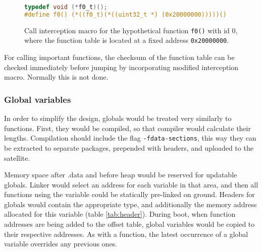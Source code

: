 \begin{figure} [htb]
\begin{lstlisting}[language=C]
typedef void (*f0_t)();
#define f0() (*((f0_t)(*((uint32_t *) (0x20000000)))))()
\end{lstlisting}
\caption{Call interception macro for the hypothetical function \texttt{f0()} with id $0$, \\where the function table is located at a fixed address \texttt{0x20000000}.}
\label{fig:macro}
\end{figure}

For calling important functions, the checksum of the function table can be checked immediately before jumping by incorporating modified interception macro. Normally this is not done.

\subsubsection{Global variables}

In order to simplify the design, globals would be treated very similarly to functions. First, they would be compiled, so that compiler would calculate their lengths. Compilation should include the flag \texttt{-fdata-sections}, this way they can be extracted to separate packages, prepended with headers, and uploaded to the satellite.

Memory space after .data and before heap would be reserved for updatable globals. Linker would select an address for each variable in that area, and then all functions using the variable could be statically pre-linked on ground. Headers for globals would contain the appropriate type, and additionally the memory address allocated for this variable (table \ref{tab:header}). During boot, when function addresses are being added to the offset table, global variables would be copied to their respective addresses. As with a function, the latest occurrence of a global variable overrides any previous ones.
